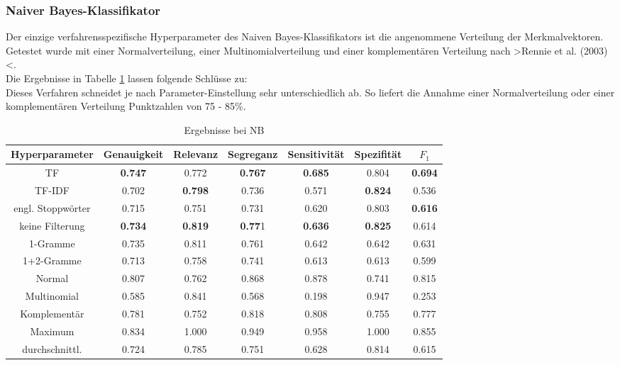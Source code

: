 \subsubsection{Naiver Bayes-Klassifikator}
Der einzige verfahrensspezifische Hyperparameter des Naiven Bayes-Klassifikators ist die angenommene Verteilung der Merkmalvektoren. Getestet wurde mit einer Normalverteilung, einer Multinomialverteilung und einer komplementären Verteilung nach >Rennie et al. (2003)<.\\
Die Ergebnisse in Tabelle \ref{results-nb} lassen folgende Schlüsse zu:\\
Dieses Verfahren schneidet je nach Parameter-Einstellung sehr unterschiedlich ab. So liefert die Annahme einer Normalverteilung oder einer komplementären Verteilung Punktzahlen von 75 - 85\%.
\begin{table}[htb]
	\begin{center}
		\begin{tabular}{|c|c|c|c|c|c|c|}
			\hline 
			Hyperparameter & Genauigkeit & Relevanz & Segreganz & Sensitivität & Spezifität & $F_1$ \\ \hline \hline
			TF         & \textbf{0.747} & 0.772 & \textbf{0.767} & \textbf{0.685} & 0.804 & \textbf{0.694} \\ \hline
			TF-IDF     & 0.702 & \textbf{0.798} & 0.736 & 0.571 & \textbf{0.824} & 0.536 \\ \hline \hline
			engl. Stoppwörter  & 0.715 & 0.751 & 0.731 & 0.620 & 0.803 & \textbf{0.616} \\ \hline
			keine Filterung    & \textbf{0.734} & \textbf{0.819} & \textbf{0.77}1 & \textbf{0.636} & \textbf{0.825} & 0.614 \\ \hline \hline
			1-Gramme    & 0.735 & 0.811 & 0.761 & 0.642 & 0.642 & 0.631 \\ \hline 
			1+2-Gramme  & 0.713 & 0.758 & 0.741 & 0.613 & 0.613 & 0.599 \\ \hline \hline
			Normal      & 0.807 & 0.762 & 0.868 & 0.878 & 0.741 & 0.815 \\ \hline 
			Multinomial & 0.585 & 0.841 & 0.568 & 0.198 & 0.947 & 0.253 \\ \hline 
			Komplementär& 0.781 & 0.752 & 0.818 & 0.808 & 0.755 & 0.777  \\ \hline 
			\hline
			Maximum        & 0.834 & 1.000 & 0.949 & 0.958 & 1.000 & 0.855 \\ \hline
			durchschnittl. & 0.724 & 0.785 & 0.751 & 0.628 & 0.814 & 0.615 \\ \hline
		\end{tabular}
		\caption{Ergebnisse bei NB}\label{results-nb}
	\end{center}
\end{table}\\
